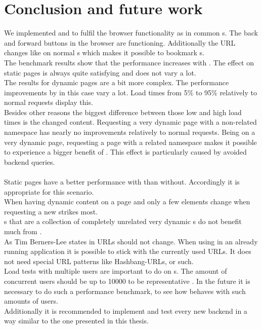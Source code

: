 \section{Conclusion and future work\label{chap:conclusion}}

We implemented \phpLare{} and \twigLare{} to fulfil the browser functionality as in common \webApplication{}s.
The back and forward buttons in the browser are functioning.
Additionally the URL changes like on normal \webApplication{}s which makes it possible to bookmark \webPage{}s.
\\
The benchmark results show that the performance increases with \lare{}.
The effect on static pages is always quite satisfying and does not vary a lot.
\\
The results for dynamic pages are a bit more complex.
The performance improvements by \lare{} in this case vary a lot.
Load times from 5\% to 95\% relatively to normal requests display this.
\\
Besides other reasons the biggest difference between those low and high load times is the changed content.
Requesting a very dynamic page with a non-related namespace has nearly no improvements relatively to normal requests.
Being on a very dynamic page, requesting a page with a related namespace makes it possible to experience a bigger benefit of \lare{}.
This effect is particularly caused by avoided backend queries.
\\
\\
Static pages have a better performance with \lare{} than without.
Accordingly it is appropriate for this scenario.
\\
When having dynamic content on a page and only a few elements change when requesting a new \webPage{} \lare{} strikes most.
\\
\WebSite{}s that are a collection of completely unrelated very dynamic \webPage{}s do not benefit much from \lare{}.
\\
As Tim Berners-Lee states in \cite{berners1998cool} URLs should not change.
When using \lare{} in an already running application it is possible to stick with the currently used URLs.
It does not need special URL patterns like Hashbang-URLs, or such.
\\
Load tests with multiple users are important to do on \webApplication{}s.
The amount of concurrent users should be up to 10000 to be representative \cite{bozdag2008performance}.
In the future it is necessary to do such a performance benchmark, to see how \lare{} behaves with such amounts of users.
\\
Additionally it is recommended to implement and test every new \lare{} backend in a way similar to the one presented in this thesis.